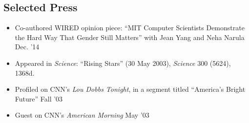 \documentclass[margin]{res}
\begin{document}
\begin{resume}
%		 
 
\section{Selected Press}
\begin{itemize}[leftmargin=*] \itemsep -2pt
\item Co-authored WIRED opinion piece: ``MIT Computer Scientists Demonstrate the Hard Way That Gender Still Matters'' with Jean Yang and Neha Narula \hfill Dec. '14
\item Appeared in \textit{Science}: ``Rising Stars'' (30 May 2003), \textit{Science} 300 (5624), 1368d.
\item Profiled on CNN's \textit{Lou Dobbs Tonight}, in a segment titled ``America's Bright Future''  \hfill Fall '03 
\item Guest on CNN's \textit{American Morning} \hfill May '03
\end{itemize}


\end{resume}
\end{document}
